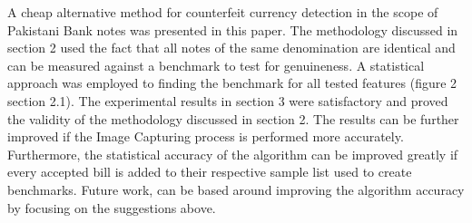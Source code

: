 \documentclass{article}
\begin{document}
A cheap alternative method for counterfeit currency detection in the scope of Pakistani Bank notes was presented in this paper. The methodology discussed in section 2 used the fact that all notes of the same denomination are identical and can be measured against a benchmark to test for genuineness. A statistical approach was employed to finding the benchmark for all tested features (figure 2 section 2.1). The experimental results in section 3 were satisfactory and proved the validity of the methodology discussed in section 2. The results can be further improved if the Image Capturing process is performed more accurately. Furthermore, the statistical accuracy of the algorithm can be improved greatly if every accepted bill is added to their respective sample list used to create benchmarks. Future work, can be based around improving the algorithm accuracy by focusing on the suggestions above.

%




\end{document}
